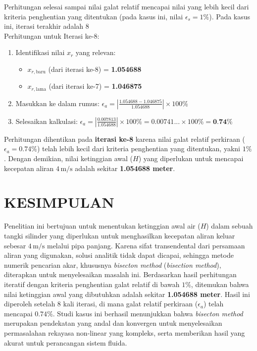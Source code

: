 \documentclass[conference]{IEEEtran}
\begin{document}
Perhitungan selesai sampai nilai galat relatif mencapai nilai yang lebih kecil dari kriteria penghentian yang ditentukan (pada kasus ini, nilai $\epsilon_s = 1\%$). Pada kasus ini, iterasi terakhir adalah 8\\
Perhitungan untuk Iterasi ke-8:
\begin{enumerate}
    \item Identifikasi nilai $x_r$ yang relevan:
    \begin{itemize}
        \item $x_{r, \text{baru}}$ (dari iterasi ke-8) = \textbf{1.054688}
        \item $x_{r, \text{lama}}$ (dari iterasi ke-7) = \textbf{1.046875}
    \end{itemize}
    
    \item Masukkan ke dalam rumus:
    $\epsilon_a = \left| \frac{1.054688 - 1.046875}{1.054688} \right| \times 100\%$
    
    \item Selesaikan kalkulasi:
    $\epsilon_a = \left| \frac{0.007813}{1.054688} \right| \times 100\% = 0.00741... \times 100\% = \textbf{0.74\%}$
\end{enumerate}

Perhitungan dihentikan pada \textbf{iterasi ke-8} karena nilai galat relatif perkiraan ($\epsilon_a = 0.74\%$) telah lebih kecil dari kriteria penghentian yang ditentukan, yakni $1\%$. Dengan demikian, nilai ketinggian awal ($H$) yang diperlukan untuk mencapai kecepatan aliran $4 \, \text{m/s}$ adalah sekitar \textbf{1.054688 meter}.

\section{KESIMPULAN}

Penelitian ini bertujuan untuk menentukan ketinggian awal air ($H$) dalam sebuah tangki silinder yang diperlukan untuk menghasilkan kecepatan aliran keluar sebesar $4 \, \text{m/s}$ melalui pipa panjang. Karena sifat transendental dari persamaan aliran yang digunakan, solusi analitik tidak dapat dicapai, sehingga metode numerik pencarian akar, khususnya \textit{bisecton method} (\textit{bisection method}), diterapkan untuk menyelesaikan masalah ini. Berdasarkan hasil perhitungan iteratif dengan kriteria penghentian galat relatif di bawah $1\%$, ditemukan bahwa nilai ketinggian awal yang dibutuhkan adalah sekitar \textbf{1.054688 meter}. Hasil ini diperoleh setelah 8 kali iterasi, di mana galat relatif perkiraan ($\epsilon_a$) telah mencapai $0.74\%$. Studi kasus ini berhasil menunjukkan bahwa \textit{bisecton method} merupakan pendekatan yang andal dan konvergen untuk menyelesaikan permasalahan rekayasa non-linear yang kompleks, serta memberikan hasil yang akurat untuk perancangan sistem fluida.
\end{document}
